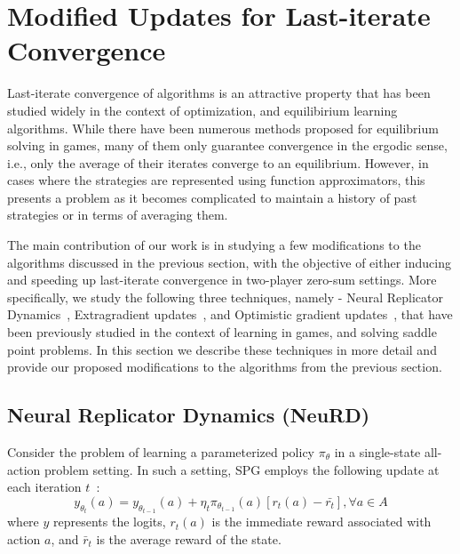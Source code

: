 \chapter{Modified Updates for Last-iterate Convergence}
\label{chp:updates}
Last-iterate convergence of algorithms is an attractive property that has been studied widely in
the context of optimization, and equilibirium learning algorithms.
While there have been numerous methods proposed for equilibrium solving in games, many of them only
guarantee convergence in the ergodic sense, i.e., only the average of their iterates converge to an
equilibrium.
However, in cases where the strategies are represented using function approximators, this presents
a problem as it becomes complicated to maintain a history of past strategies or in terms of
averaging them.

The main contribution of our work is in studying a few modifications to the algorithms discussed in
the previous section, with the objective of either inducing and speeding up last-iterate
convergence in two-player zero-sum settings.
More specifically, we study the following three techniques, namely - Neural Replicator
Dynamics~\cite{hennesNeural2020}, Extragradient updates~\cite{korpelevichextragradient1976}, and
Optimistic gradient updates~\cite{popovmodification1980}, that have been previously studied in the
context of learning in games, and solving saddle point problems.
In this section we describe these techniques in more detail and provide our proposed modifications
to the algorithms from the previous section.

\section{Neural Replicator Dynamics (NeuRD)}


Consider the problem of learning a parameterized policy $\pi_{\theta}$ in a single-state all-action
problem setting.
In such a setting, SPG employs the following update at each iteration
$t$~\cite[Section~A.1]{hennesNeural2020}: \[y_{\theta_t}(a) = y_{\theta_{t-1}} (a) + \eta_t
	\pi_{\theta_{t-1}}(a) [r_t(a) - \bar{r_t}], \forall a \in A\] where $y$ represents the logits,
$r_t(a)$ is the immediate reward associated with action $a$, and $\bar{r}_t$ is the average reward
of the state.

